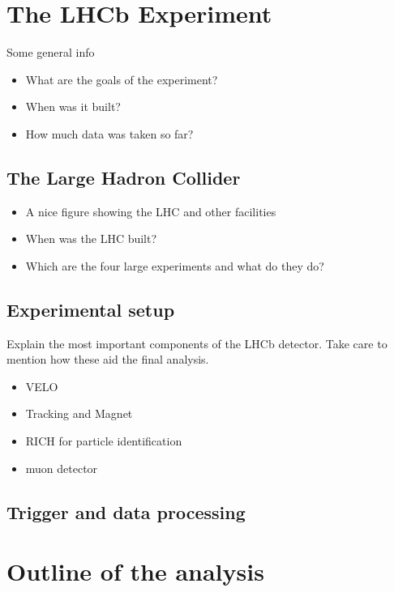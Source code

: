 \chapter{The LHCb Experiment} %

Some general info
\begin{itemize}
  \item What are the goals of the experiment?
  \item When was it built?
  \item How much data was taken so far?
\end{itemize}

\section{The Large Hadron Collider}

\begin{itemize}
  \item A nice figure showing the LHC and other facilities
  \item When was the LHC built?
  \item Which are the four large experiments and what do they do?
\end{itemize}

\section{Experimental setup}

Explain the most important components of the LHCb detector.
Take care to mention how these aid the final analysis.
\begin{itemize}
  \item VELO
  \item Tracking and Magnet
  \item RICH for particle identification
  \item muon detector
\end{itemize}

\section{Trigger and data processing}

\chapter{Outline of the analysis} %

